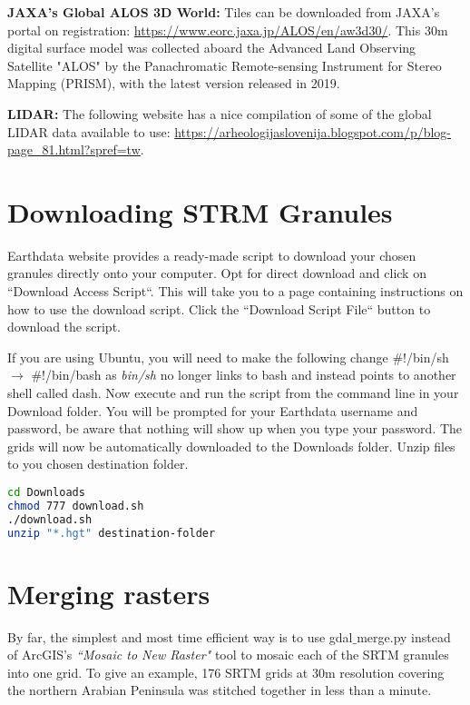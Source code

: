 \noindent \textbf{JAXA's Global ALOS 3D World:} Tiles can be downloaded from JAXA's portal on registration: \url{https://www.eorc.jaxa.jp/ALOS/en/aw3d30/}. This 30m digital surface model was collected aboard the Advanced Land Observing Satellite "ALOS" by the Panachromatic Remote-sensing Instrument for Stereo Mapping (PRISM), with the latest version released in 2019. 

\vspace{3mm}

\noindent \textbf{LIDAR:} The following website has a nice compilation of some of the global LIDAR data available to use: \url{https://arheologijaslovenija.blogspot.com/p/blog-page_81.html?spref=tw}. 


\section{Downloading STRM Granules}

Earthdata website provides a ready-made script to download your chosen granules directly onto your computer. Opt for direct download and click on ``Download Access Script``. This will take you to a page containing instructions on how to use the download script. Click the ``Download Script File`` button to download the script. 

\noindent If you are using Ubuntu, you will need to make the following change $\#$!/bin/sh $\rightarrow$ $\#$!/bin/bash as \textit{bin/sh} no longer links to bash and instead points to another shell called dash. Now execute and run the script from the command line in your Download folder. You will be prompted for your Earthdata username and password, be aware that nothing will show up when you type your password. The grids will now be automatically downloaded to the Downloads folder. Unzip files to you chosen destination folder.

\begin{lstlisting}[language=bash]
cd Downloads
chmod 777 download.sh 
./download.sh 
unzip "*.hgt" destination-folder
\end{lstlisting}


\section{Merging rasters}

By far, the simplest and most time efficient way is to use gdal${\_}$merge.py instead of ArcGIS's \textit{``Mosaic to New Raster"} tool to mosaic each of the SRTM granules into one grid. To give an example, 176 SRTM grids at 30m resolution covering the northern Arabian Peninsula was stitched together in less than a minute.

